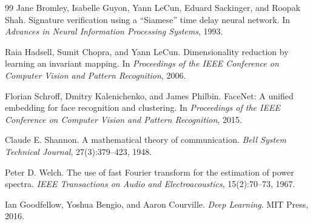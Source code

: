 \documentclass[12pt]{report}
\begin{document}
\begin{thebibliography}{99}
Jane Bromley, Isabelle Guyon, Yann LeCun, Eduard Sackinger, and Roopak Shah.
\newblock Signature verification using a ``Siamese'' time delay neural network.
\newblock In \emph{Advances in Neural Information Processing Systems}, 1993.

Raia Hadsell, Sumit Chopra, and Yann LeCun.
\newblock Dimensionality reduction by learning an invariant mapping.
\newblock In \emph{Proceedings of the IEEE Conference on Computer Vision and Pattern Recognition}, 2006.

Florian Schroff, Dmitry Kalenichenko, and James Philbin.
\newblock FaceNet: A unified embedding for face recognition and clustering.
\newblock In \emph{Proceedings of the IEEE Conference on Computer Vision and Pattern Recognition}, 2015.

Claude E. Shannon.
\newblock A mathematical theory of communication.
\newblock \emph{Bell System Technical Journal}, 27(3):379--423, 1948.

Peter D. Welch.
\newblock The use of fast Fourier transform for the estimation of power spectra.
\newblock \emph{IEEE Transactions on Audio and Electroacoustics}, 15(2):70--73, 1967.

Ian Goodfellow, Yoshua Bengio, and Aaron Courville.
\newblock \emph{Deep Learning}.
\newblock MIT Press, 2016.
\end{thebibliography}
\end{document}
